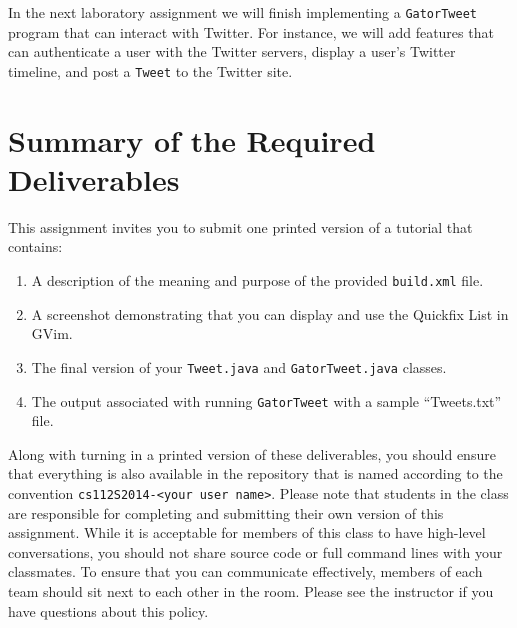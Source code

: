 In the next laboratory assignment we will finish implementing a {\tt GatorTweet} program that can interact with Twitter. For
instance, we will add features that can authenticate a user with the Twitter servers, display a user's Twitter timeline, and post
a {\tt Tweet} to the Twitter site.

\section*{Summary of the Required Deliverables}

  This assignment invites you to submit one printed version of a tutorial that contains:

  \begin{enumerate}
    \item A description of the meaning and purpose of the provided {\tt build.xml} file.
    \item A screenshot demonstrating that you can display and use the Quickfix List in GVim.
    \item The final version of your {\tt Tweet.java} and {\tt GatorTweet.java} classes.
    \item The output associated with running {\tt GatorTweet} with a sample ``Tweets.txt'' file.
  \end{enumerate}

  Along with turning in a printed version of these deliverables, you should ensure that everything is also available in the
  repository that is named according to the convention {\tt cs112S2014-<your user name>}. Please note that students in the class
  are responsible for completing and submitting their own version of this assignment.    While it is acceptable for members of
  this class to have high-level conversations, you should not share source code or full command lines with your classmates. To
  ensure that you can communicate effectively, members of each team should sit next to each other in the room.  Please see the
  instructor if you have questions about this policy.

  
